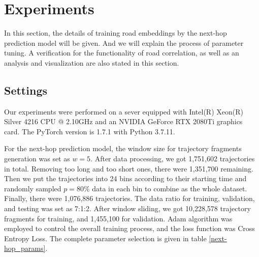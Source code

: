
\section{Experiments}
In this section, the details of training road embeddings by the next-hop prediction model will be given. And we will explain the process of parameter tuning. A verification for the functionality of road correlation, as well as an analysis and visualization are also stated in this section.

\subsection{Settings}
Our experiments were performed on a sever equipped with Intel(R) Xeon(R) Silver 4216 CPU @ 2.10GHz and an NVIDIA GeForce RTX 2080Ti graphics card. The PyTorch version is 1.7.1 with Python 3.7.11.

For the next-hop prediction model, the window size for trajectory fragments generation was set as $w=5$. After data processing, we got 1,751,602 trajectories in total. Removing too long and too short ones, there were 1,351,700 remaining. Then we put the trajectories into 24 bins according to their starting time and randomly sampled $p=80\%$ data in each bin to combine as the whole dataset. Finally, there were 1,076,886 trajectories. The data ratio for training, validation, and testing was set as 7:1:2. After window sliding, we got 10,228,578 trajectory fragments for training, and 1,455,100 for validation. Adam algorithm was employed to control the overall training process, and the loss function was Cross Entropy Loss. The complete parameter selection is given in table \ref{next-hop_params}.

